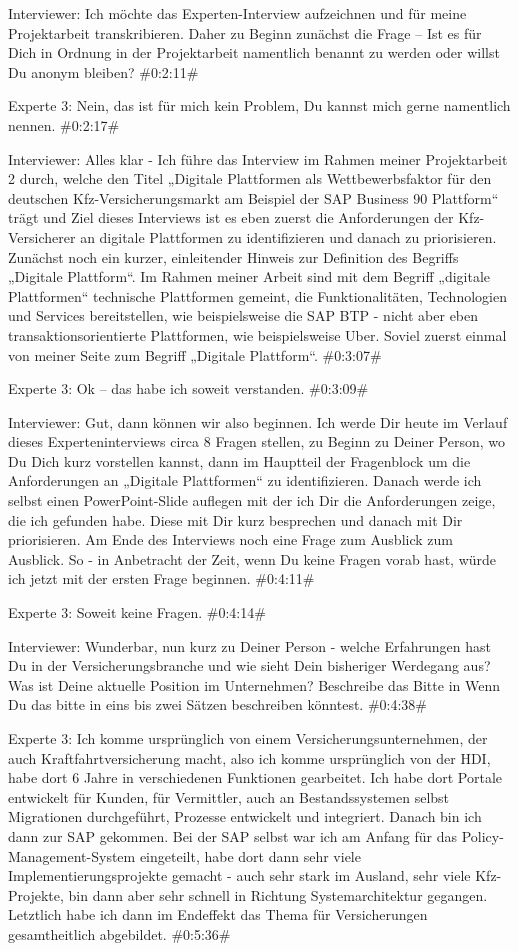 Interviewer:
Ich möchte das Experten-Interview aufzeichnen und für meine Projektarbeit transkribieren. Daher zu Beginn zunächst die Frage – Ist es für Dich in Ordnung in der Projektarbeit namentlich benannt zu werden oder willst Du anonym bleiben?
\#0:2:11\#

Experte 3:
Nein, das ist für mich kein Problem, Du kannst mich gerne namentlich nennen.
\#0:2:17\#

Interviewer:
Alles klar - Ich führe das Interview im Rahmen meiner Projektarbeit 2 durch, welche den Titel „Digitale Plattformen als Wettbewerbsfaktor für den deutschen Kfz-Versicherungsmarkt am Beispiel der SAP Business 90 Plattform“ trägt und Ziel dieses Interviews ist es eben zuerst die Anforderungen der Kfz-Versicherer an digitale Plattformen zu identifizieren und danach zu priorisieren. Zunächst noch ein kurzer, einleitender Hinweis zur Definition des Begriffs „Digitale Plattform“. Im Rahmen meiner Arbeit sind mit dem Begriff „digitale Plattformen“ technische Plattformen gemeint, die Funktionalitäten, Technologien und Services bereitstellen, wie beispielsweise die SAP BTP - nicht aber eben transaktionsorientierte Plattformen, wie beispielsweise Uber. Soviel zuerst einmal von meiner Seite zum Begriff „Digitale Plattform“.
\#0:3:07\#

Experte 3:
Ok – das habe ich soweit verstanden.
\#0:3:09\#

Interviewer:
Gut, dann können wir also beginnen. Ich werde Dir heute im Verlauf dieses Experteninterviews circa 8 Fragen stellen, zu Beginn zu Deiner Person, wo Du Dich kurz vorstellen kannst, dann im Hauptteil der Fragenblock um die Anforderungen an „Digitale Plattformen“ zu identifizieren. Danach werde ich selbst einen PowerPoint-Slide auflegen mit der ich Dir die Anforderungen zeige, die ich gefunden habe. Diese mit Dir kurz besprechen und danach mit Dir priorisieren. Am Ende des Interviews noch eine Frage zum Ausblick zum Ausblick. So - in Anbetracht der Zeit, wenn Du keine Fragen vorab hast, würde ich jetzt mit der ersten Frage beginnen.
\#0:4:11\#

Experte 3:
Soweit keine Fragen. 
\#0:4:14\#

Interviewer:
Wunderbar, nun kurz zu Deiner Person - welche Erfahrungen hast Du in der Versicherungsbranche und wie sieht Dein bisheriger Werdegang aus? Was ist Deine aktuelle Position im Unternehmen? Beschreibe das Bitte in Wenn Du das bitte in eins bis zwei Sätzen beschreiben könntest.
\#0:4:38\#

Experte 3:
Ich komme ursprünglich von einem Versicherungsunternehmen, der auch Kraftfahrtversicherung macht, also ich komme ursprünglich von der HDI, habe dort 6 Jahre in verschiedenen Funktionen gearbeitet. Ich habe dort Portale entwickelt für Kunden, für Vermittler, auch an Bestandssystemen selbst Migrationen durchgeführt, Prozesse entwickelt und integriert. Danach bin ich dann zur SAP gekommen. Bei der SAP selbst war ich am Anfang für das Policy-Management-System eingeteilt, habe dort dann sehr viele Implementierungsprojekte gemacht - auch sehr stark im Ausland, sehr viele Kfz-Projekte, bin dann aber sehr schnell in Richtung Systemarchitektur gegangen. Letztlich habe ich dann im Endeffekt das Thema für Versicherungen gesamtheitlich abgebildet.
\#0:5:36\#

